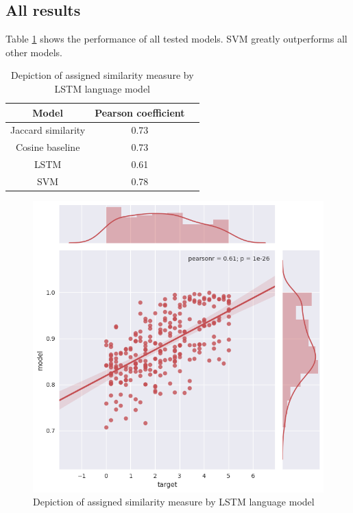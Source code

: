 \documentclass[10pt, a4paper]{article}
\begin{document}
\begin{table}[h!]
\subsection{All results}

Table \ref{tab:all_results} shows the performance of all tested models.
SVM greatly outperforms all other models.

\begin{table}
	\caption{Model comparison}
\label{tab:all_results}
\begin{center}
\begin{tabular}{ccc}
\toprule
Model & Pearson coefficient \\
\midrule
Jaccard similarity & 0.73 \\
Cosine baseline & 0.73 \\
LSTM & 0.61 \\
SVM & 0.78 \\
\bottomrule
\end{tabular}
\end{center}
\end{table}


\newpage
\begin{figure}
	\begin{center}
	\includegraphics[width=\columnwidth]{lstm_corr.png}
	\caption{Depiction of assigned similarity measure by LSTM language model}
	\label{fig:lstm_corr}
	\end{center}
\end{figure}




\end{table}
\end{document}
